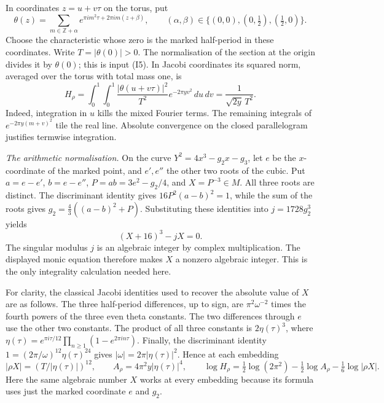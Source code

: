 \documentclass[11pt,letterpaper]{article}
\begin{document}
In coordinates $z=u+v\tau$ on the torus, put
\begin{equation}\label{D:163}
 \theta(z)=\sum_{m\in\mathbb Z+\alpha}
   e^{\pi i m^2\tau+2\pi i m(z+\beta)},\qquad
 (\alpha,\beta)\in\{(0,0),(0,\tfrac12),(\tfrac12,0)\}.
\end{equation}
Choose the characteristic whose zero is the marked half-period in these
coordinates. Write $T=|\theta(0)|>0$. The normalisation of the section
at the origin divides it by $\theta(0)$; this is input (I5). In Jacobi coordinates its
squared norm, averaged over the torus with total mass one, is
\begin{equation}\label{D:164}
 H_\rho=\int_0^1\!\!\int_0^1
   \frac{|\theta(u+v\tau)|^2}{T^2}e^{-2\pi yv^2}\,du\,dv
          =\frac{1}{\sqrt{2y}\,T^2}.
\end{equation}
Indeed, integration in $u$ kills the mixed Fourier terms. The remaining
integrals of $e^{-2\pi y(m+v)^2}$ tile the real line. Absolute convergence
on the closed parallelogram justifies termwise integration.

\emph{The arithmetic normalisation.} On the curve
$Y^2=4x^3-g_2x-g_3$, let $e$ be the $x$-coordinate of the marked
point, and $e',e''$ the other two roots of the cubic. Put
$a=e-e'$, $b=e-e''$, $P=ab=3e^2-g_2/4$, and $X=P^{-3}\in M$.
All three roots are distinct. The discriminant identity gives
$16P^2(a-b)^2=1$, while the sum of the roots gives
$g_2=\tfrac43((a-b)^2+P)$. Substituting these identities into
$j=1728g_2^3$ yields
\begin{equation}\label{D:165}
                    (X+16)^3-jX=0.
\end{equation}
The singular modulus $j$ is an algebraic integer by complex
multiplication. The displayed monic equation therefore makes $X$ a
nonzero algebraic integer. This is the only integrality calculation
needed here.

For clarity, the classical Jacobi identities used to recover the
absolute value of $X$ are as follows. The three half-period
differences, up to sign, are $\pi^2\omega^{-2}$ times the fourth
powers of the three even theta constants. The two differences through
$e$ use the other two constants. The product of all three constants
is $2\eta(\tau)^3$, where
$\eta(\tau)=e^{\pi i\tau/12}\prod_{n\ge1}(1-e^{2\pi i n\tau})$.
Finally, the discriminant identity
$1=(2\pi/\omega)^{12}\eta(\tau)^{24}$ gives
$|\omega|=2\pi|\eta(\tau)|^2$. Hence at each embedding
\begin{equation}\label{D:166}
 |\rho X|=(T/|\eta(\tau)|)^{12},\qquad
 A_\rho=4\pi^2 y|\eta(\tau)|^4,\qquad
 \log H_\rho=\tfrac12\log(2\pi^2)-\tfrac12\log A_\rho
                 -\tfrac16\log|\rho X|.
\end{equation}
Here the same algebraic number $X$ works at every embedding because
its formula uses just the marked coordinate $e$ and $g_2$.
\end{document}

